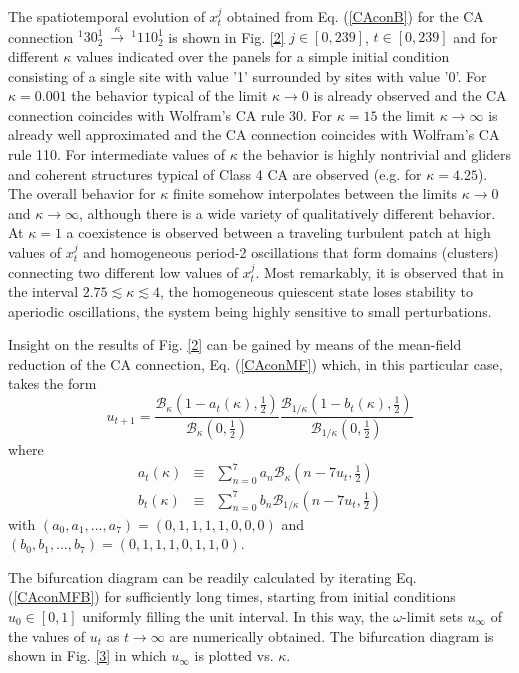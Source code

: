 \documentclass[aps,pre,preprint,floatfix]{revtex4}
\theoremstyle{plain} \newtheorem{defi}{Definition}[section]
\theoremstyle{plain} \newtheorem{prop}{Proposition}[section]
\theoremstyle{plain} \newtheorem{theor}{Theorem}[section]
\theoremstyle{plain} \newtheorem{lemma}{Lemma}[section]
\theoremstyle{plain} \newtheorem*{corol}{Corollary}
\theoremstyle{remark} \newtheorem*{rem}{Remark}
\theoremstyle{plain} \newtheorem{exer}{Exercise}[section]
\theoremstyle{remark} \newtheorem*{ans}{Answer}
\begin{document}
The spatiotemporal evolution of $x_t^j$ obtained from Eq. (\ref{CAconB}) for the CA connection $^{1}30_{2}^{1}\ \xrightarrow{\kappa}\ ^{1}110_{2}^{1}$ is shown in Fig. \ref{2} $j\in [0,239]$, $t\in [0,239]$ and for different $\kappa$ values indicated over the panels for a simple initial condition consisting of a single site with value '1' surrounded by sites with value '0'. For $\kappa=0.001$ the behavior typical of the limit $\kappa \to 0$ is already observed and the CA connection coincides with Wolfram's CA rule 30. For $\kappa=15$ the limit $\kappa \to \infty$ is already well approximated and the CA connection coincides with Wolfram's CA rule 110. For intermediate values of $\kappa$ the behavior is highly nontrivial and gliders and coherent structures typical of Class 4 CA \cite{Wolfram, Ilachinski} are observed (e.g. for $\kappa=4.25$). The overall behavior for $\kappa$ finite somehow interpolates between the limits $\kappa \to 0$ and $\kappa \to \infty$, although there is a wide variety of qualitatively different behavior. At $\kappa=1$ a coexistence is observed between a traveling turbulent patch at high values of $x_t^j$ and homogeneous period-2 oscillations that form domains (clusters) connecting two different low values of $x_t^j$. Most remarkably, it is observed that in the interval $2.75\lesssim \kappa \lesssim 4$, the homogeneous quiescent state loses stability to aperiodic oscillations, the system being highly sensitive to small perturbations.

Insight on the results of Fig. \ref{2} can be gained by means of the mean-field reduction of the CA connection, Eq. (\ref{CAconMF}) which, in this particular case, takes the form
\begin{equation}
u_{t+1}=\frac{\mathcal{B}_{\kappa}\left(1-a_{t}(\kappa) ,\frac{1}{2}\right)}{\mathcal{B}_{\kappa}(0,\frac{1}{2})}\frac{\mathcal{B}_{1/\kappa}\left(1-b_{t}(\kappa) ,\frac{1}{2}\right)}{\mathcal{B}_{1/\kappa}(0,\frac{1}{2})} \label{CAconMFB}
\end{equation}
where
\begin{eqnarray}
a_{t}(\kappa)&\equiv&\sum_{n=0}^{7}a_{n}\mathcal{B}_{\kappa}\left(n-7u_t,\frac{1}{2}\right) \label{finfiMFB}\\
b_{t}(\kappa)&\equiv&\sum_{n=0}^{7}b_{n}\mathcal{B}_{1/\kappa}\left(n-7u_t,\frac{1}{2}\right) \label{g0MFB}
\end{eqnarray} 
with $(a_0,a_1,\ldots,a_7)=(0,1,1,1,1,0,0,0)$ and $(b_0,b_1,\ldots,b_7)=(0,1,1,1,0,1,1,0)$.   

The bifurcation diagram can be readily calculated by iterating Eq. (\ref{CAconMFB}) for sufficiently long times, starting from initial conditions $u_{0}\in [0,1]$ uniformly filling the unit interval. In this way, the $\omega$-limit sets $u_{\infty}$ of the values of $u_t$ as $t\to \infty$ are numerically obtained. The bifurcation diagram is shown in Fig. \ref{3} in which $u_{\infty}$ is plotted vs. $\kappa$.  
\end{document}
